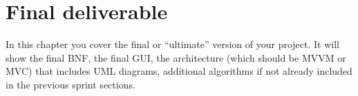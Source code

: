 \documentclass[a4paper, oneside, 11pt]{report}
\begin{document}



\chapter{Final deliverable}\label{Impl}

In this chapter you cover the final or ``ultimate'' version of your project. It will show the final BNF, the final GUI, the architecture (which should be MVVM or MVC) that includes UML diagrams, additional algorithms if not already included in the previous sprint sections.
\end{document}
